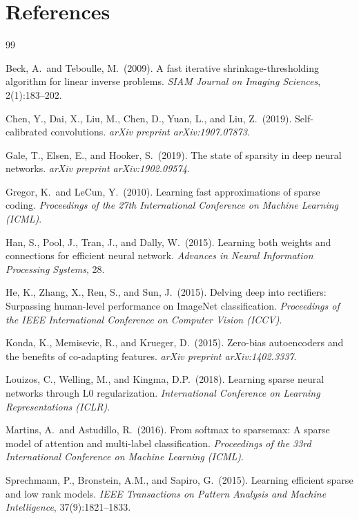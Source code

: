 \documentclass{article}
\begin{document}

\section*{References}
{\small
\begin{thebibliography}{99}

Beck, A.\ and Teboulle, M.\ (2009).
A fast iterative shrinkage-thresholding algorithm for linear inverse problems.
{\it SIAM Journal on Imaging Sciences}, 2(1):183--202.

Chen, Y., Dai, X., Liu, M., Chen, D., Yuan, L., and Liu, Z.\ (2019).
Self-calibrated convolutions.
{\it arXiv preprint arXiv:1907.07873}.

Gale, T., Elsen, E., and Hooker, S.\ (2019).
The state of sparsity in deep neural networks.
{\it arXiv preprint arXiv:1902.09574}.

Gregor, K.\ and LeCun, Y.\ (2010).
Learning fast approximations of sparse coding.
{\it Proceedings of the 27th International Conference on Machine Learning (ICML)}.

Han, S., Pool, J., Tran, J., and Dally, W.\ (2015).
Learning both weights and connections for efficient neural network.
{\it Advances in Neural Information Processing Systems}, 28.

He, K., Zhang, X., Ren, S., and Sun, J.\ (2015).
Delving deep into rectifiers: Surpassing human-level performance on ImageNet classification.
{\it Proceedings of the IEEE International Conference on Computer Vision (ICCV)}.

Konda, K., Memisevic, R., and Krueger, D.\ (2015).
Zero-bias autoencoders and the benefits of co-adapting features.
{\it arXiv preprint arXiv:1402.3337}.

Louizos, C., Welling, M., and Kingma, D.P.\ (2018).
Learning sparse neural networks through L0 regularization.
{\it International Conference on Learning Representations (ICLR)}.

Martins, A.\ and Astudillo, R.\ (2016).
From softmax to sparsemax: A sparse model of attention and multi-label classification.
{\it Proceedings of the 33rd International Conference on Machine Learning (ICML)}.

Sprechmann, P., Bronstein, A.M., and Sapiro, G.\ (2015).
Learning efficient sparse and low rank models.
{\it IEEE Transactions on Pattern Analysis and Machine Intelligence}, 37(9):1821--1833.


\end{thebibliography}}
\end{document}
